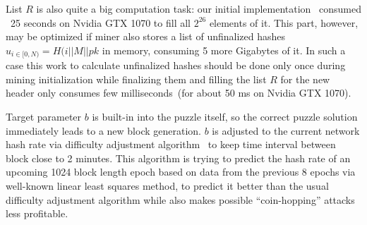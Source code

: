 List $R$ is also quite a big computation task: our initial implementation~\cite{ergoMiner}
consumed ~25 seconds on Nvidia GTX 1070 to fill all $2^{26}$ elements of it.
This part, however, may be optimized if miner also stores a list of unfinalized hashes $u_{i \in [0,N)}=H(i||M||pk$ in memory, consuming 5 more Gigabytes of it. In such a case this work to calculate unfinalized hashes should
be done only once during mining initialization while finalizing them and filling the list $R$
for the new header only consumes few milliseconds~(for about 50 ms on Nvidia GTX 1070).

Target parameter $b$ is built-in into the puzzle itself, so the correct puzzle solution immediately
leads to a new block generation. $b$ is adjusted to the current network hash rate via difficulty adjustment
algorithm~\cite{meshkov2017short} to keep time interval between block close to 2 minutes.
This algorithm is trying to predict the hash rate of an upcoming 1024 block length epoch
based on data from the previous 8 epochs via well-known linear least squares method,
to predict it better than the usual difficulty adjustment algorithm while also makes possible
``coin-hopping'' attacks less profitable.
